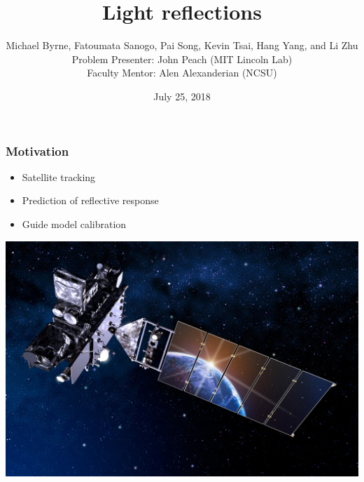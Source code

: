 \documentclass{beamer}
\title{Light reflections}
\date{July 25, 2018}
\author{
Michael Byrne, 
Fatoumata Sanogo,
Pai Song,
Kevin Tsai,
Hang Yang, and
Li Zhu\\
\medskip
Problem Presenter:  John Peach (MIT Lincoln Lab)\\
Faculty Mentor: Alen Alexanderian (NCSU)
}
\institute[Abbreviation]{SAMSI-IMSM}
\begin{document}
\begin{frame}
\titlepage
\end{frame}

\begin{frame}[t] 
\frametitle{Motivation} 
\begin{itemize} 
\item Satellite tracking 
\item Prediction of reflective response 
\item Guide model calibration 
\vspace{2mm}
\end{itemize} 
\centerline{\includegraphics[width = 0.5\linewidth]{./figs/Satellite.jpg}} 
\end{frame} 
 
\end{document}
